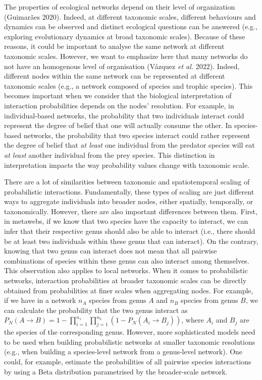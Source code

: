 \documentclass[11pt]{article}
\begin{document}
The properties of ecological networks depend on their level of
organization (Guimarães 2020). Indeed, at different taxonomic scales,
different behaviours and dynamics can be observed and distinct
ecological questions can be answered (e.g., exploring evolutionary
dynamics at broad taxonomic scales). Because of these reasons, it could
be important to analyse the same network at different taxonomic scales.
However, we want to emphasize here that many networks do not have an
homogenous level of organisation (Vázquez \emph{et al.} 2022). Indeed,
different nodes within the same network can be represented at different
taxonomic scales (e.g., a network composed of species and trophic
species). This becomes important when we consider that the biological
interpretation of interaction probabilities depends on the nodes'
resolution. For example, in individual-based networks, the probability
that two individuals interact could represent the degree of belief that
one will actually consume the other. In species-based networks, the
probability that two species interact could rather represent the degree
of belief that \emph{at least} one individual from the predator species
will eat \emph{at least} another individual from the prey species. This
distinction in interpretation impacts the way probability values change
with taxonomic scale.

There are a lot of similarities between taxonomic and spatiotemporal
scaling of probabilistic interactions. Fundamentally, these types of
scaling are just different ways to aggregate individuals into broader
nodes, either spatially, temporally, or taxonomically. However, there
are also important differences between them. First, in metawebs, if we
know that two species have the capacity to interact, we can infer that
their respective genus should also be able to interact (i.e., there
should be at least two individuals within these genus that can
interact). On the contrary, knowing that two genus can interact does not
mean that all pairwise combinations of species within these genus can
also interact among themselves. This observation also applies to local
networks. When it comes to probabilistic networks, interaction
probabilities at broader taxonomic scales can be directly obtained from
probabilities at finer scales when aggregating nodes. For example, if we
have in a network \(n_A\) species from genus \(A\) and \(n_B\) species
from genus \(B\), we can calculate the probability that the two genus
interact as
\(P_N(A \rightarrow B) = 1 - \prod_{i = 1}^{n_1}\prod_{j = 1}^{n_2}(1 - P_N(A_i \rightarrow B_j))\),
where \(A_i\) and \(B_j\) are the species of the corresponding genus.
However, more sophisticated models need to be used when building
probabilistic networks at smaller taxonomic resolutions (e.g., when
building a species-level network from a genus-level network). One could,
for example, estimate the probabilities of all pairwise species
interactions by using a Beta distribution parametrised by the
broader-scale network.
\end{document}
